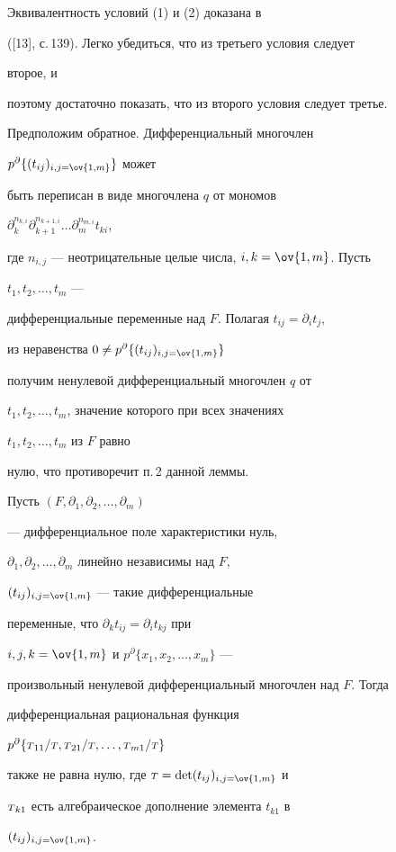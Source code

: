 \begin{pf} 


Эквивалентность условий (1) и (2) доказана в 


([13], с.\,139). Легко убедиться, что из третьего условия следует 


второе, и 


поэтому достаточно показать, что из второго условия следует третье.  


Предположим обратное. Дифференциальный многочлен 


$p^\partial\{(t_{ij})_{i,j=\ov{1,m}}\}$ может 


быть переписан в виде многочлена $q$ от мономов 


$\partial^{n_{k,i}}_k\partial^{n_{k+1,i}}_{k+1}\dotsc 


\partial^{n_{m,i}}_{m}t_{ki}$, 


где $n_{i,j}$ --- неотрицательные целые числа, $i,k=\ov{1,m}$. Пусть 


$t_1,t_2,\dotsc,t_m$ --- 


дифференциальные переменные над $F$. Полагая $t_{ij}=\partial_i t_j$, 


из неравенства $0\ne p^\partial\{(t_{ij})_{i,j=\ov{1,m}}\}$ 


получим ненулевой дифференциальный многочлен $q$ от  


$t_1,t_2,\dotsc,t_m$, значение которого при всех значениях 


$t_1,t_2,\dotsc,t_m$ из $F$ равно  


нулю, что противоречит п.\,2 данной леммы.  


\end{pf} 


 


\begin{lem} 


Пусть $(F,\partial_1,\partial_2,\dotsc,\partial_m)$ 


--- дифференциальное поле характеристики нуль, \linebreak


$\partial_1,\partial_2,\dotsc,\partial_m$ линейно независимы над $F$, 


$(t_{ij})_{i,j=\ov{1,m}}$ --- такие дифференциальные 


переменные, что $\partial_k t_{ij}=\partial_i t_{kj}$ при 


$i,j,k=\ov{1,m}$ и $p^\partial\{x_1,x_2,\dotsc,x_m\}$ --- 


произвольный ненулевой дифференциальный многочлен над $F$. Тогда 


дифференциальная рациональная функция 


$p^\partial\{\st_{11}/\st,\st_{21}/\st,\dotsc,\linebreak\st_{m1}/\st\}$


также не равна нулю, где $\st=\det(t_{ij})_{i,j=\ov{1,m}}$ и 


${\scriptstyle T}_{k1}$ есть алгебраическое дополнение элемента $t_{k1}$ в 


$(t_{ij})_{i,j=\ov{1,m}}$. 


\end{lem} 


